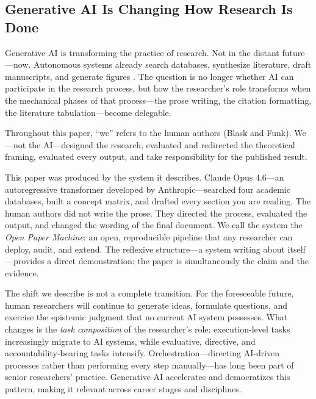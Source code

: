 \documentclass{article}
\begin{document}
\subsection{Generative AI Is Changing How Research Is Done}

Generative AI is transforming the practice of research. Not in the distant future---now. Autonomous systems already search databases, synthesize literature, draft manuscripts, and generate figures \citep{yamada2025scientist,ifargan2024autonomous,asai2024openscholar,zheng2025automation}. The question is no longer whether AI can participate in the research process, but how the researcher's role transforms when the mechanical phases of that process---the prose writing, the citation formatting, the literature tabulation---become delegable.

Throughout this paper, ``we'' refers to the human authors (Blask and Funk). We---not the AI---designed the research, evaluated and redirected the theoretical framing, evaluated every output, and take responsibility for the published result.

This paper was produced by the system it describes. Claude Opus 4.6---an autoregressive transformer developed by Anthropic---searched four academic databases, built a concept matrix, and drafted every section you are reading. The human authors did not write the prose. They directed the process, evaluated the output, and changed the wording of the final document. We call the system the \textit{Open Paper Machine}: an open, reproducible pipeline that any researcher can deploy, audit, and extend. The reflexive structure---a system writing about itself---provides a direct demonstration: the paper is simultaneously the claim and the evidence.

The shift we describe is not a complete transition. For the foreseeable future, human researchers will continue to generate ideas, formulate questions, and exercise the epistemic judgment that no current AI system possesses. What changes is the \textit{task composition} of the researcher's role: execution-level tasks increasingly migrate to AI systems, while evaluative, directive, and accountability-bearing tasks intensify. Orchestration---directing AI-driven processes rather than performing every step manually---has long been part of senior researchers' practice. Generative AI accelerates and democratizes this pattern, making it relevant across career stages and disciplines.
\end{document}
